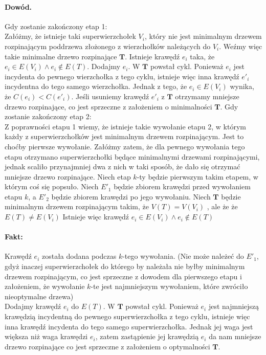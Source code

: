 \documentclass[12pt]{article}
\begin{document}
\paragraph*{Dowód.}
Gdy zostanie zakończony etap 1: \\
Załóżmy, że istnieje taki superwierzchołek $V_i$,  który 
nie jest minimalnym drzewem rozpinającym poddrzewa złożonego z wierzchołków należących do $V_i$. Weźmy więc takie minimalne drzewo rozpinające $\textbf{T}$. Istnieje krawędź ${e_i}$ taka, że
 ${e_{i}\in E(V_{i})\land e_{i}\not \in E(T)}$. Dodajmy $e_{i}$. W $\textbf{T}$ powstał cykl. Ponieważ ${e_i}$ jest incydenta do pewnego wierzchołka z tego cyklu, istnieje więc inna krawędź  ${e'_i}$ incydentna do tego samego wierzchołka. Jednak z tego, że ${e_{i}\in E(V_{i})}$ wynika, że $C(e_{i})<C(e'_{i})$. Jeśli usuniemy krawędź ${e'_i}$ z $\textbf{T}$ otrzymamy mniejsze drzewo rozpinające, co jest sprzeczne z założeniem o minimalności $\textbf{T}$. 
 \BlankLine
 Gdy zostanie zakończony etap 2: \\
 Z poprawności etapu 1 wiemy, że istnieje takie wywołanie etapu 2, w którym każdy z superwierzchołków jest minimalnym drzewem rozpinającym. Jest to choćby pierwsze wywołanie. Załóżmy zatem, że dla pewnego wywołania tego etapu otrzymano superwierzchołki będące minimalnymi drzewami rozpinającymi, jednak scaliło przynajmniej dwa z nich w taki sposób, że dało się otrzymać mniejsze drzewo rozpinające.
 \BlankLine
 Niech etap $k$-ty będzie pierwszym takim etapem, w którym coś się popsuło. Niech $E'_{1}$ będzie zbiorem krawędzi przed wywołaniem etapu $k$, a $E'_{2}$ będzie zbiorem krawędzi po jego wywołaniu. Niech $\textbf{T}$ będzie minimalnym drzewem rozpinającym takim, że $V(T)=V(V_{i})$ , ale że  że $E(T)\not =E(V_{i})$ Istnieje więc krawędź $e_{i}\in E(V_{i})\land e_{i}\not \in E(T)$
 \paragraph*{Fakt:} Krawędź $e_{i}$ została dodana podczas $k$-tego 
 wywołania. (Nie może należeć do $E'_{1}$, gdyż inaczej superwierzchołek do którego by należała nie byłby minimalnym drzewem rozpinającym, co jest sprzeczne z dowodem dla pierwszego etapu i założeniem, że wywołanie $k$-te jest najmniejszym wywołaniem, które zwróciło nieoptymalne drzewa) \\
  \BlankLine
 Dodajmy krawędź  $e_{i}$ do $E(T)$. W $\textbf{T}$ powstał cykl. Ponieważ $e_{i}$ jest najmniejszą krawędzią incydentną do pewnego superwierzchołka z tego cyklu, istnieje więc inna krawędź incydenta do tego samego superwierzchołka. Jednak jej waga jest większa niż waga krawędzi  $e_{i}$, zatem zastąpienie jej krawędzią $e_{i}$ da nam mniejsze drzewo rozpinające co jest sprzeczne z założeniem o optymalności $\textbf{T}$.
\end{document}
